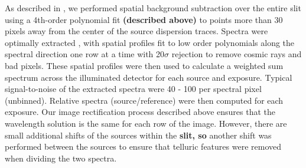 \documentclass[twocolumn]{aastex6}
\begin{document}
As described in \citet{2016ApJ...826..156S}, we performed spatial background subtraction over the entire slit using a 4th-order polynomial fit \textbf{(described above)} to points more than 30 pixels away from the center of the source dispersion traces.  Spectra were optimally extracted \citep{1986ApJ...302..757H}, with spatial profiles fit to low order polynomials along the spectral direction one row at a time with 20$\sigma$ rejection to remove cosmic rays and bad pixels.
These spatial profiles were then used to calculate a weighted sum spectrum across the illuminated detector for each source and exposure. 
Typical signal-to-noise of the extracted spectra were 40 - 100 per spectral pixel (unbinned).
Relative spectra (source/reference) were then computed for each exposure.
Our image rectification process described above ensures that the wavelength solution is the same for each row of the image.
However, there are small additional shifts of the sources within the \textbf{slit, so} another shift was performed between the sources to ensure that telluric features were removed when dividing the two spectra.

\end{document}
